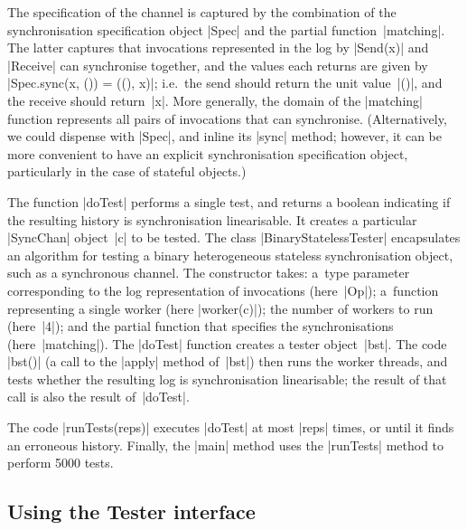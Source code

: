 The specification of the channel is captured by the combination of the
synchronisation specification object |Spec| and the partial
function~|matching|.  The latter captures that invocations represented in the
log by |Send(x)| and |Receive| can synchronise together, and the values each
returns are given by |Spec.sync(x, ()) = ((), x)|; i.e.~the send should return
the unit value~|()|, and the receive should return~|x|.  More generally, the
domain of the |matching| function represents all pairs of invocations that can
synchronise.  (Alternatively, we could dispense with |Spec|, and inline its
|sync| method; however, it can be more convenient to have an explicit
synchronisation specification object, particularly in the case of stateful
objects.)

The function |doTest| performs a single test, and returns a boolean indicating
if the resulting history is synchronisation linearisable.  It creates a
particular |SyncChan| object~|c| to be tested.  The class
|BinaryStatelessTester| encapsulates an algorithm for testing a binary
heterogeneous stateless synchronisation object, such as a synchronous channel.
The constructor takes: a~type parameter corresponding to the log
representation of invocations (here~|Op|); a~function representing a single
worker (here |worker(c)|); the number of workers to run (here~|4|); and the
partial function that specifies the synchronisations (here~|matching|).  The
|doTest| function creates a tester object~|bst|.  The code |bst()| (a call to
the |apply| method of~|bst|) then runs the worker threads, and tests whether
the resulting log is synchronisation linearisable; the result of that call is
also the result of~|doTest|.

The code |runTests(reps)| executes |doTest| at most |reps| times, or until it
finds an erroneous history.  Finally, the |main| method uses the |runTests|
method to perform 5000 tests.


\subsection{Using the {\scalashape Tester} interface}


